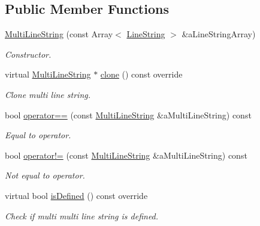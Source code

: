 \subsection*{Public Member Functions}
\begin{DoxyCompactItemize}
\item 
\hyperlink{classostk_1_1math_1_1geom_1_1d2_1_1objects_1_1_multi_line_string_a5a30febbcbc28097e34b6f2f3f456b79}{Multi\+Line\+String} (const Array$<$ \hyperlink{classostk_1_1math_1_1geom_1_1d2_1_1objects_1_1_line_string}{Line\+String} $>$ \&a\+Line\+String\+Array)
\begin{DoxyCompactList}\small\item\em Constructor. \end{DoxyCompactList}\item 
virtual \hyperlink{classostk_1_1math_1_1geom_1_1d2_1_1objects_1_1_multi_line_string}{Multi\+Line\+String} $\ast$ \hyperlink{classostk_1_1math_1_1geom_1_1d2_1_1objects_1_1_multi_line_string_abf1b39f7e7f9c1f1ba9b040669863e81}{clone} () const override
\begin{DoxyCompactList}\small\item\em Clone multi line string. \end{DoxyCompactList}\item 
bool \hyperlink{classostk_1_1math_1_1geom_1_1d2_1_1objects_1_1_multi_line_string_af0bbb61f35a16ac8c61283221d2ddc43}{operator==} (const \hyperlink{classostk_1_1math_1_1geom_1_1d2_1_1objects_1_1_multi_line_string}{Multi\+Line\+String} \&a\+Multi\+Line\+String) const
\begin{DoxyCompactList}\small\item\em Equal to operator. \end{DoxyCompactList}\item 
bool \hyperlink{classostk_1_1math_1_1geom_1_1d2_1_1objects_1_1_multi_line_string_a124780190c563f303f81bff8e25ed742}{operator!=} (const \hyperlink{classostk_1_1math_1_1geom_1_1d2_1_1objects_1_1_multi_line_string}{Multi\+Line\+String} \&a\+Multi\+Line\+String) const
\begin{DoxyCompactList}\small\item\em Not equal to operator. \end{DoxyCompactList}\item 
virtual bool \hyperlink{classostk_1_1math_1_1geom_1_1d2_1_1objects_1_1_multi_line_string_a446d9d1344336d6ec8b2ff1e46629ca2}{is\+Defined} () const override
\begin{DoxyCompactList}\small\item\em Check if multi multi line string is defined. \end{DoxyCompactList}\item 

\end{DoxyCompactItemize}

